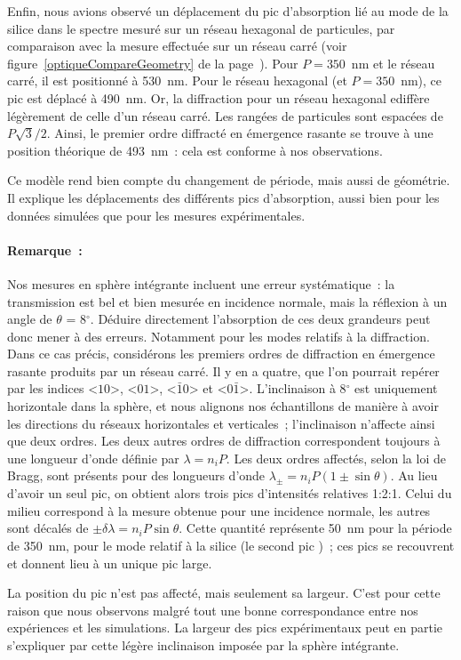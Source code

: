 Enfin, nous avions observé un déplacement du pic d'absorption lié au mode de la silice dans le spectre mesuré sur un réseau hexagonal de particules, par comparaison avec la mesure effectuée sur un réseau carré (voir figure~\ref{optiqueCompareGeometry} de la page~\pageref{optiqueCompareGeometry}). Pour $P = 350$~nm et le réseau carré, il est positionné à 530~nm. Pour le réseau hexagonal (et $P=350$~nm), ce pic est déplacé à 490~nm. Or, la diffraction pour un réseau hexagonal ediffère légèrement de celle d'un réseau carré. Les rangées de particules sont espacées de $P\sqrt{3}/2$. Ainsi, le premier ordre diffracté en émergence rasante se trouve à une position théorique de 493~nm~: cela est conforme à nos observations.\par 

Ce modèle rend bien compte du changement de période, mais aussi de géométrie. Il explique les déplacements des différents pics d'absorption, aussi bien pour les données simulées que pour les mesures expérimentales.\par 

\paragraph*{Remarque~:} Nos mesures en sphère intégrante incluent une erreur systématique~: la transmission est bel et bien mesurée en incidence normale, mais la réflexion à un angle de $\theta$ = 8$^\circ$. Déduire directement l'absorption de ces deux grandeurs peut donc mener à des erreurs. Notamment pour les modes relatifs à la diffraction. Dans ce cas précis, considérons les premiers ordres de diffraction en émergence rasante produits par un réseau carré. Il y en a quatre, que l'on pourrait repérer par les indices <$10$>, <$01$>, <$\bar{1}0$> et <$0\bar{1}$>. L'inclinaison à 8$^\circ$ est uniquement horizontale dans la sphère, et nous alignons nos échantillons de manière à avoir les directions du réseaux horizontales et verticales~; l'inclinaison n'affecte ainsi que deux ordres. Les deux autres ordres de diffraction correspondent toujours à une longueur d'onde définie par $\lambda = n_iP$. Les deux ordres affectés, selon la loi de Bragg, sont présents pour des longueurs d'onde $\lambda_\pm = n_iP(1\pm\sin\theta)$. Au lieu d'avoir un seul pic, on obtient alors trois pics d'intensités relatives {1:2:1}. Celui du milieu correspond à la mesure obtenue pour une incidence normale, les autres sont décalés de $\pm\delta\lambda = n_iP\sin\theta$. Cette quantité représente 50~nm pour la période de 350~nm, pour le mode relatif à la silice (le \og second pic \fg)~; ces pics se recouvrent et donnent lieu à un unique pic large.\par
La position du pic n'est pas affecté, mais seulement sa largeur. C'est pour cette raison que nous observons malgré tout une bonne correspondance entre nos expériences et les simulations. La largeur des pics expérimentaux peut en partie s'expliquer par cette légère inclinaison imposée par la sphère intégrante.\par 
 


